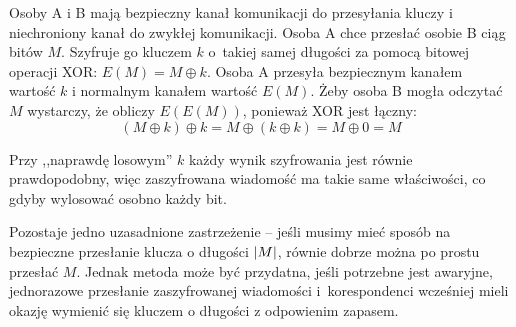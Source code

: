 Osoby A i B mają bezpieczny kanał komunikacji do przesyłania kluczy i niechroniony kanał do zwykłej komunikacji. Osoba A chce przesłać osobie B ciąg bitów \( M \).
Szyfruje go kluczem \( k \) o~takiej samej długości za pomocą bitowej operacji XOR: \( E(M) = M \oplus k \).
Osoba A przesyła bezpiecznym kanałem wartość \( k \) i normalnym kanałem wartość \( E(M) \). Żeby osoba B mogła odczytać \( M \) wystarczy, że obliczy \( E(E(M)) \), ponieważ XOR jest łączny:
\[
    (M \oplus k) \oplus k = M \oplus (k \oplus k)  = M \oplus 0 = M
\]

Przy ,,naprawdę losowym'' \( k \) każdy wynik szyfrowania jest równie prawdopodobny, więc zaszyfrowana wiadomość ma takie same właściwości, co gdyby wylosować osobno każdy bit.

Pozostaje jedno uzasadnione zastrzeżenie -- jeśli musimy mieć sposób na bezpieczne przesłanie klucza o długości \( \left\lvert M\right\rvert \), równie dobrze można po prostu przesłać \( M \).
Jednak metoda może być przydatna, jeśli potrzebne jest awaryjne, jednorazowe przesłanie zaszyfrowanej wiadomości i~korespondenci wcześniej mieli okazję wymienić się kluczem o długości z odpowienim zapasem.